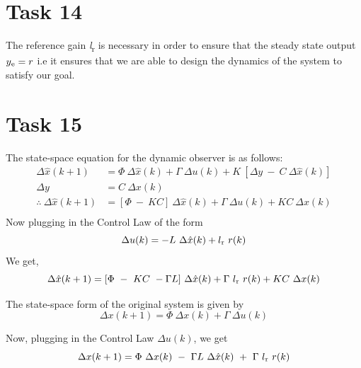 \documentclass[a4paper,12pt,oneside,onecolumn]{article} %
\begin{document}
\section*{Task 14}

The reference gain \textit l\textsubscript{r} is necessary in order to ensure that the steady state output $y \textsubscript {e} = r$ i.e it ensures that we are able to design the dynamics of the system to satisfy our goal.

\section*{Task 15}

The state-space equation for the dynamic observer is as follows:
\begin{align}
\Delta \hat{x}(k+1) &= \Phi \ \Delta  \hat{x}(k) + \Gamma \ \Delta u(k) + K \ [\Delta y \ - \  C \ \Delta \hat{x}(k)] \\
\Delta y \ &= C \ \Delta x(k) \\ 
\therefore \  \Delta \hat{x}(k+1) &= [\Phi \ - \ KC] \ \Delta  \hat{x}(k) + \Gamma \ \Delta u(k) + K C \ \Delta x(k) \\
\end{align}
Now plugging in the Control Law of the form
\begin{equation}
\Delta u(k) = -L \ \Delta  \hat{x}(k) + l \textsubscript{r} \ r(k) \\ 
\end{equation}
We get, \\
\begin{equation}
\Delta \hat{x}(k+1) = [\Phi \ - \ KC \ -\Gamma L] \ \Delta  \hat{x}(k) + \Gamma \ l \textsubscript{r} \ r(k) + K C \ \Delta x(k) \\
\end{equation}

The state-space form of the original system is given by
\begin{equation}
\Delta x(k+1) = \Phi \ \Delta  x(k) + \Gamma \ \Delta u(k) 
\end {equation}

Now, plugging in the Control Law $\Delta u(k)$, we get
\begin{equation}
\Delta x(k+1) = \Phi \ \Delta  x(k) \ - \ \Gamma L \ \Delta \hat{x}(k)  \ + \ \Gamma \ l\textsubscript{r} \  r(k)
\end {equation}
\end{document}
